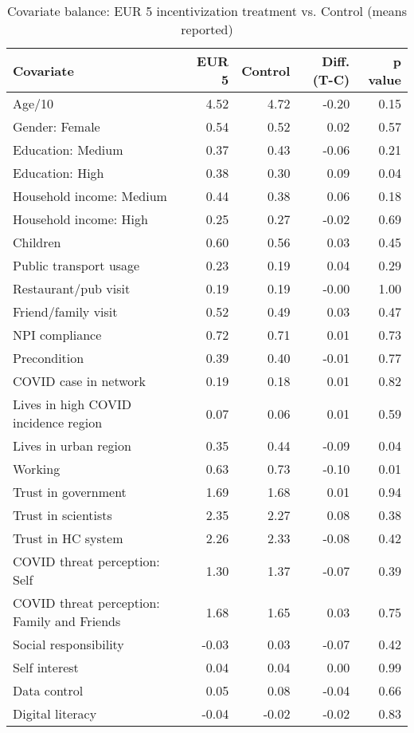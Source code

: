 \begin{table}[h!]
\centering
\caption{Covariate balance: EUR 5 incentivization treatment vs. Control (means reported)} 
\label{tab:eur5-balance}
\begingroup\footnotesize
\begin{tabular}{lrrrr}
  \hline
Covariate & EUR 5 & Control & Diff. (T-C) & p value \\ 
  \hline
Age/10 & 4.52 & 4.72 & -0.20 & 0.15 \\ 
  Gender: Female & 0.54 & 0.52 & 0.02 & 0.57 \\ 
  Education: Medium & 0.37 & 0.43 & -0.06 & 0.21 \\ 
  Education: High & 0.38 & 0.30 & 0.09 & 0.04 \\ 
  Household income: Medium & 0.44 & 0.38 & 0.06 & 0.18 \\ 
  Household income: High & 0.25 & 0.27 & -0.02 & 0.69 \\ 
  Children & 0.60 & 0.56 & 0.03 & 0.45 \\ 
  Public transport usage & 0.23 & 0.19 & 0.04 & 0.29 \\ 
  Restaurant/pub visit & 0.19 & 0.19 & -0.00 & 1.00 \\ 
  Friend/family visit & 0.52 & 0.49 & 0.03 & 0.47 \\ 
  NPI compliance & 0.72 & 0.71 & 0.01 & 0.73 \\ 
  Precondition & 0.39 & 0.40 & -0.01 & 0.77 \\ 
  COVID case in network & 0.19 & 0.18 & 0.01 & 0.82 \\ 
  Lives in high COVID incidence region & 0.07 & 0.06 & 0.01 & 0.59 \\ 
  Lives in urban region & 0.35 & 0.44 & -0.09 & 0.04 \\ 
  Working & 0.63 & 0.73 & -0.10 & 0.01 \\ 
  Trust in government & 1.69 & 1.68 & 0.01 & 0.94 \\ 
  Trust in scientists & 2.35 & 2.27 & 0.08 & 0.38 \\ 
  Trust in HC system & 2.26 & 2.33 & -0.08 & 0.42 \\ 
  COVID threat perception: Self & 1.30 & 1.37 & -0.07 & 0.39 \\ 
  COVID threat perception: Family and Friends & 1.68 & 1.65 & 0.03 & 0.75 \\ 
  Social responsibility & -0.03 & 0.03 & -0.07 & 0.42 \\ 
  Self interest & 0.04 & 0.04 & 0.00 & 0.99 \\ 
  Data control & 0.05 & 0.08 & -0.04 & 0.66 \\ 
  Digital literacy & -0.04 & -0.02 & -0.02 & 0.83 \\ 
   \hline
\end{tabular}
\endgroup
\end{table}
